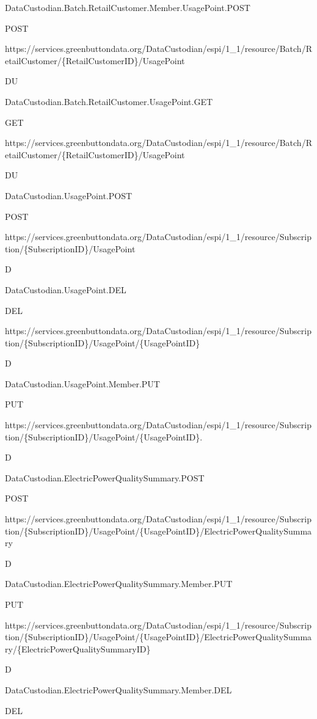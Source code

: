 \documentclass[a4paper,12pt,single,pdftex]{scrbook}
\begin{document}
DataCustodian.Batch.RetailCustomer.Member.UsagePoint.POST

POST

https://services.greenbuttondata.org/DataCustodian/espi/1\_1/resource/Batch/RetailCustomer/\{RetailCustomerID\}/UsagePoint

DU

DataCustodian.Batch.RetailCustomer.UsagePoint.GET

GET

https://services.greenbuttondata.org/DataCustodian/espi/1\_1/resource/Batch/RetailCustomer/\{RetailCustomerID\}/UsagePoint

DU

DataCustodian.UsagePoint.POST

POST

https://services.greenbuttondata.org/DataCustodian/espi/1\_1/resource/Subscription/\{SubscriptionID\}/UsagePoint

D

DataCustodian.UsagePoint.DEL

DEL

https://services.greenbuttondata.org/DataCustodian/espi/1\_1/resource/Subscription/\{SubscriptionID\}/UsagePoint/\{UsagePointID\}

D

DataCustodian.UsagePoint.Member.PUT

PUT

https://services.greenbuttondata.org/DataCustodian/espi/1\_1/resource/Subscription/\{SubscriptionID\}/UsagePoint/\{UsagePointID\}.

D

DataCustodian.ElectricPowerQualitySummary.POST

POST

https://services.greenbuttondata.org/DataCustodian/espi/1\_1/resource/Subscription/\{SubscriptionID\}/UsagePoint/\{UsagePointID\}/ElectricPowerQualitySummary

D

DataCustodian.ElectricPowerQualitySummary.Member.PUT

PUT

https://services.greenbuttondata.org/DataCustodian/espi/1\_1/resource/Subscription/\{SubscriptionID\}/UsagePoint/\{UsagePointID\}/ElectricPowerQualitySummary/\{ElectricPowerQualitySummaryID\}

D

DataCustodian.ElectricPowerQualitySummary.Member.DEL

DEL
\end{document}
